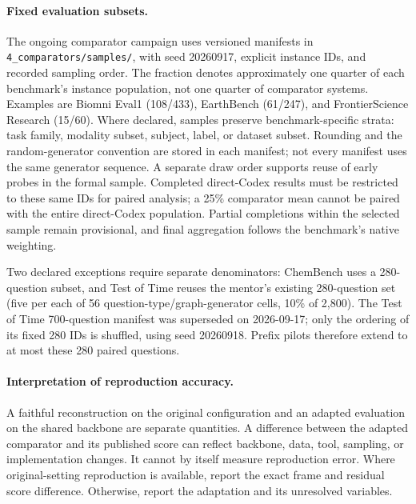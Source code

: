 \paragraph{Fixed evaluation subsets.}
The ongoing comparator campaign uses versioned manifests in
\texttt{4\_comparators/samples/}, with seed 20260917, explicit instance IDs, and recorded
sampling order. The fraction denotes approximately one quarter of each benchmark's instance
population, not one quarter of comparator systems. Examples are Biomni Eval1 (108/433),
EarthBench (61/247), and FrontierScience Research (15/60). Where declared, samples preserve
benchmark-specific strata: task family, modality subset, subject, label, or dataset subset.
Rounding and the random-generator convention are stored in each manifest; not every manifest
uses the same generator sequence. A separate draw order supports reuse of early probes in the
formal sample. Completed direct-Codex results must be restricted to these same IDs for paired
analysis; a 25\% comparator mean cannot be paired with the entire direct-Codex population.
Partial completions within the selected sample remain provisional, and final aggregation follows
the benchmark's native weighting. 

Two declared exceptions require separate denominators: ChemBench uses a 280-question
subset, and Test of Time reuses the mentor's existing 280-question set (five per each of 56
question-type/graph-generator cells, 10\% of 2{,}800). The Test of Time 700-question manifest
was superseded on 2026-09-17; only the ordering of its fixed 280 IDs is shuffled, using seed
20260918. Prefix pilots therefore extend to at most these 280 paired questions.

\paragraph{Interpretation of reproduction accuracy.}
A faithful reconstruction on the original configuration and an adapted evaluation on the shared
backbone are separate quantities. A difference between the adapted comparator and its published
score can reflect backbone, data, tool, sampling, or implementation changes. It cannot by itself
measure reproduction error. Where original-setting reproduction is available, report the exact
frame and residual score difference. Otherwise, report the adaptation and its unresolved
variables. 

